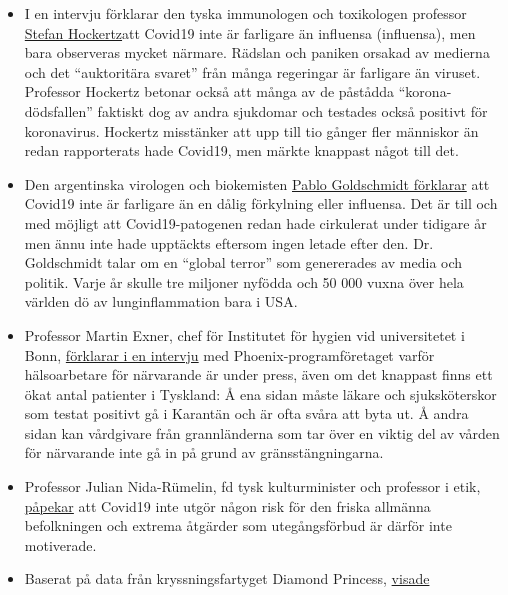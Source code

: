 \begin{itemize}
\tightlist
\item
  I en intervju förklarar den tyska immunologen och toxikologen
  professor \href{https://www.youtube.com/watch?v=7wfb-B0BWmo}{Stefan
  Hockertz}att Covid19 inte är farligare än influensa (influensa), men
  bara observeras mycket närmare. Rädslan och paniken orsakad av
  medierna och det ``auktoritära svaret'' från många regeringar är
  farligare än viruset. Professor Hockertz betonar också att många av de
  påstådda ``korona-dödsfallen'' faktiskt dog av andra sjukdomar och
  testades också positivt för koronavirus. Hockertz misstänker att upp
  till tio gånger fler människor än redan rapporterats hade Covid19, men
  märkte knappast något till det.
\item
  Den argentinska virologen och biokemisten
  \href{https://www.clarin.com/buena-vida/coronavirus-panico-injustificado-dice-virologo-argentino-francia_0_yVcmJ4RM.html}{Pablo
  Goldschmidt förklarar} att Covid19 inte är farligare än en dålig
  förkylning eller influensa. Det är till och med möjligt att
  Covid19-patogenen redan hade cirkulerat under tidigare år men ännu
  inte hade upptäckts eftersom ingen letade efter den. Dr. Goldschmidt
  talar om en ``global terror'' som genererades av media och politik.
  Varje år skulle tre miljoner nyfödda och 50 000 vuxna över hela
  världen dö av lunginflammation bara i USA.
\item
  Professor Martin Exner, chef för Institutet för hygien vid
  universitetet i Bonn,
  \href{https://www.youtube.com/watch?v=9mI9trSm3PY}{förklarar i en
  intervju} med Phoenix-programföretaget varför hälsoarbetare för
  närvarande är under press, även om det knappast finns ett ökat antal
  patienter i Tyskland: Å ena sidan måste läkare och sjuksköterskor som
  testat positivt gå i Karantän och är ofta svåra att byta ut. Å andra
  sidan kan vårdgivare från grannländerna som tar över en viktig del av
  vården för närvarande inte gå in på grund av gränsstängningarna.
\item
  Professor Julian Nida-Rümelin, fd tysk kulturminister och professor i
  etik,
  \href{https://www.zdf.de/nachrichten/zdf-morgenmagazin/julian-nida-ruemelin-zur-corona-krise-100.html}{påpekar}
  att Covid19 inte utgör någon risk för den friska allmänna befolkningen
  och extrema åtgärder som utegångsförbud är därför inte motiverade.
\item
  Baserat på data från kryssningsfartyget Diamond Princess,
  \href{https://www.statnews.com/2020/03/17/a-fiasco-in-the-making-as-the-coronavirus-pandemic-takes-hold-we-are-making-decisions-without-reliable-data/}{visade}

\end{itemize}
